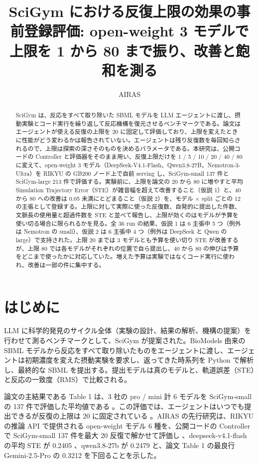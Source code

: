 \documentclass{article}
\title{SciGym における反復上限の効果の事前登録評価: open-weight 3 モデルで上限を 1 から 80 まで振り、改善と飽和を測る}
\author{AIRAS}
\providecommand{\unverified}[1]{#1}
\begin{document}
\maketitle

\begin{abstract}
SciGym \citep{duan-2025-measuring} は、反応をすべて取り除いた SBML モデルを LLM エージェントに渡し、摂動実験とコード実行を繰り返して反応機構を復元させるベンチマークである。論文はエージェントが使える反復の上限を 20 に固定して評価しており、上限を変えたときに性能がどう変わるかは報告されていない。エージェントは残り反復数を毎回知らされるので、上限は探索の深さそのものを決めるパラメータである。本研究は、公開コードの Controller と評価器をそのまま用い、反復上限だけを 1 / 5 / 10 / 20 / 40 / 80 に変えて、open-weight 3 モデル（DeepSeek-V4.1-Flash、Qwen3.8-27B、Nemotron-3-Ultra）を RIKYU の GB200 ノード上で自前 serving し、SciGym-small 137 件と SciGym-large 213 件で評価する。実験前に、上限を論文の 20 から 80 に増やすと平均 Simulation Trajectory Error（STE）が雑音幅を超えて改善すること（仮説 1）と、40 から 80 への改善は 0.05 未満にとどまること（仮説 2）を、モデル × split ごとの 12 の主張として登録する。上限に対して実際に使った反復数、自発的に提出した件数、文脈長の使用量と超過件数を STE と並べて報告し、上限が効くのはモデルが予算を使い切る場合に限られるかを見る。全 36 run の結果、仮説 1 は 6 主張中 5 つ（例外は Nemotron の small）、仮説 2 は 6 主張中 4 つ（例外は DeepSeek と Qwen の large）で支持された。上限 20 までは 3 モデルとも予算を使い切り STE が改善するが、上限 80 では各モデルがそれぞれの位置で自ら提出し、40 から 80 の伸びは予算をどこまで使ったかに対応していた。増えた予算は実験ではなくコード実行に使われ、改善は一部の件に集中する。
\end{abstract}

\section{はじめに}
\label{sec:intro}
LLM に科学的発見のサイクル全体（実験の設計、結果の解析、機構の提案）を行わせて測るベンチマークとして、SciGym \citep{duan-2025-measuring} が提案された。BioModels 由来の SBML モデルから反応をすべて取り除いたものをエージェントに渡し、エージェントは初期濃度を変えた摂動実験を要求し、返ってきた時系列を Python で解析し、最終的な SBML を提出する。提出モデルは真のモデルと、軌道誤差（STE）と反応の一致度（RMS）で比較される。

論文の主結果である Table 1 は、3 社の pro / mini 計 6 モデルを SciGym-small の 137 件で評価した平均値である \cite[s1.p2, s1.p6]{duan-2025-measuring}。この評価では、エージェントはいつでも提出できるが反復の上限は 20 に固定されている \cite[s1.p3]{duan-2025-measuring}。AIRAS の先行研究は、RIKYU の推論 API で提供される open-weight モデル 6 種を、公開コードの Controller で SciGym-small 137 件を最大 20 反復で解かせて評価し \cite[s3.p1]{scigymrikyuopenmodels-2026-scigym}、deepseek-v4.1-flash の平均 STE が \unverified{0.2405} \cite[s3.p2]{scigymrikyuopenmodels-2026-scigym}、qwen3.8-27b が \unverified{0.2479} \cite[s3.p3]{scigymrikyuopenmodels-2026-scigym} と、論文 Table 1 の最良行 Gemini-2.5-Pro の \unverified{0.3212} \cite[s1.p5]{duan-2025-measuring} を下回ることを示した。
\end{document}

